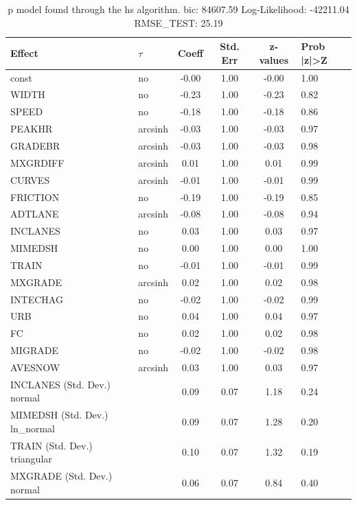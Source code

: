 \begin{table}
	\caption{p model found through the hs algorithm. bic: 84607.59 Log-Likelihood: -42211.04 RMSE_TEST: 25.19}
	\begin{center}
		\begin{tabular}{|l|l|c|c|c|l|}
			\hline
			Effect & $\tau$ & Coeff & Std. Err & z-values & Prob |z|>Z \\
			\hline
			const & no & -0.00 & 1.00 & -0.00 & 1.00 \\
			\hline
			WIDTH & no & -0.23 & 1.00 & -0.23 & 0.82 \\
			\hline
			SPEED & no & -0.18 & 1.00 & -0.18 & 0.86 \\
			\hline
			PEAKHR & arcsinh & -0.03 & 1.00 & -0.03 & 0.97 \\
			\hline
			GRADEBR & arcsinh & -0.03 & 1.00 & -0.03 & 0.98 \\
			\hline
			MXGRDIFF & arcsinh & 0.01 & 1.00 & 0.01 & 0.99 \\
			\hline
			CURVES & arcsinh & -0.01 & 1.00 & -0.01 & 0.99 \\
			\hline
			FRICTION & no & -0.19 & 1.00 & -0.19 & 0.85 \\
			\hline
			ADTLANE & arcsinh & -0.08 & 1.00 & -0.08 & 0.94 \\
			\hline
			INCLANES & no & 0.03 & 1.00 & 0.03 & 0.97 \\
			\hline
			MIMEDSH & no & 0.00 & 1.00 & 0.00 & 1.00 \\
			\hline
			TRAIN & no & -0.01 & 1.00 & -0.01 & 0.99 \\
			\hline
			MXGRADE & arcsinh & 0.02 & 1.00 & 0.02 & 0.98 \\
			\hline
			INTECHAG & no & -0.02 & 1.00 & -0.02 & 0.99 \\
			\hline
			URB & no & 0.04 & 1.00 & 0.04 & 0.97 \\
			\hline
			FC & no & 0.02 & 1.00 & 0.02 & 0.98 \\
			\hline
			MIGRADE & no & -0.02 & 1.00 & -0.02 & 0.98 \\
			\hline
			AVESNOW & arcsinh & 0.03 & 1.00 & 0.03 & 0.97 \\
			\hline
			INCLANES (Std. Dev.) normal &  & 0.09 & 0.07 & 1.18 & 0.24 \\
			\hline
			MIMEDSH (Std. Dev.) ln_normal &  & 0.09 & 0.07 & 1.28 & 0.20 \\
			\hline
			TRAIN (Std. Dev.) triangular &  & 0.10 & 0.07 & 1.32 & 0.19 \\
			\hline
			MXGRADE (Std. Dev.) normal &  & 0.06 & 0.07 & 0.84 & 0.40 \\

\end{tabular}
\end{center}
\end{table}
